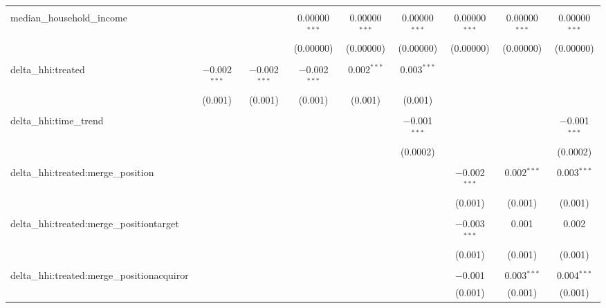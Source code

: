 \begin{table}[H]
{\begin{tabular}{@{\extracolsep{5pt}}lcccccccc}
   & & & & & & & & \\  

  median\_household\_income &  &  & 0.00000$^{***}$ & 0.00000$^{***}$ & 0.00000$^{***}$ & 0.00000$^{***}$ & 0.00000$^{***}$ & 0.00000$^{***}$ \\  

   &  &  & (0.00000) & (0.00000) & (0.00000) & (0.00000) & (0.00000) & (0.00000) \\  

   & & & & & & & & \\  

  delta\_hhi:treated & $-$0.002$^{***}$ & $-$0.002$^{***}$ & $-$0.002$^{***}$ & 0.002$^{***}$ & 0.003$^{***}$ &  &  &  \\  

   & (0.001) & (0.001) & (0.001) & (0.001) & (0.001) &  &  &  \\  

   & & & & & & & & \\  

  delta\_hhi:time\_trend &  &  &  &  & $-$0.001$^{***}$ &  &  & $-$0.001$^{***}$ \\  

   &  &  &  &  & (0.0002) &  &  & (0.0002) \\  

   & & & & & & & & \\  

  delta\_hhi:treated:merge\_position &  &  &  &  &  & $-$0.002$^{***}$ & 0.002$^{***}$ & 0.003$^{***}$ \\  

   &  &  &  &  &  & (0.001) & (0.001) & (0.001) \\  

   & & & & & & & & \\  

  delta\_hhi:treated:merge\_positiontarget &  &  &  &  &  & $-$0.003$^{***}$ & 0.001 & 0.002 \\  

   &  &  &  &  &  & (0.001) & (0.001) & (0.001) \\  

   & & & & & & & & \\  

  delta\_hhi:treated:merge\_positionacquiror &  &  &  &  &  & $-$0.001 & 0.003$^{***}$ & 0.004$^{***}$ \\  

   &  &  &  &  &  & (0.001) & (0.001) & (0.001) \\  


\end{tabular}}
\end{table}
